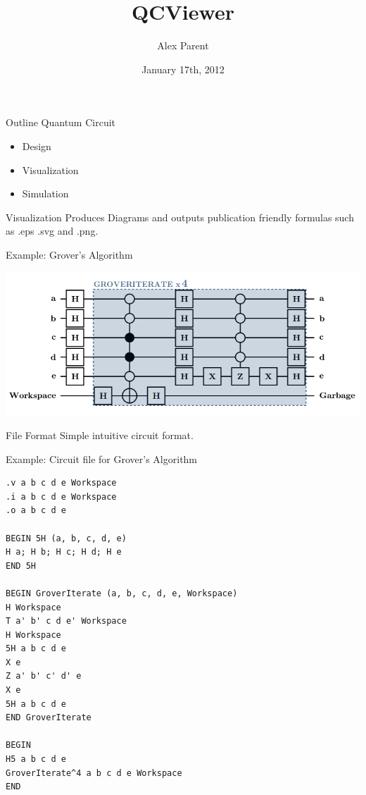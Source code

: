 \documentclass{beamer}
\title{QCViewer}
\author{Alex Parent}
\institute{University of Waterloo, IQC}
\date{January 17th, 2012}
\begin{document}
\begin{frame}
\titlepage
\end{frame}

\begin{frame}{Outline}
Quantum Circuit
\begin{itemize}
\item Design
\item Visualization 
\item Simulation  
\end{itemize}
\end{frame}

\begin{frame}{Visualization}
Produces Diagrams and outputs publication friendly formulas 
such as .eps .svg and .png.

Example: Grover's Algorithm 
\begin{center}
\includegraphics[scale=0.32]{grover_circuit}
\end{center}
\end{frame}

\begin{frame}[fragile]{File Format}
Simple intuitive circuit format.

Example: Circuit file for Grover's Algorithm
\begin{center}
\begin{tiny}
\begin{BVerbatim}[boxwidth=auto]
.v a b c d e Workspace
.i a b c d e Workspace
.o a b c d e

BEGIN 5H (a, b, c, d, e)
H a; H b; H c; H d; H e
END 5H

BEGIN GroverIterate (a, b, c, d, e, Workspace)
H Workspace
T a' b' c d e' Workspace
H Workspace
5H a b c d e
X e
Z a' b' c' d' e
X e
5H a b c d e
END GroverIterate

BEGIN
H5 a b c d e
GroverIterate^4 a b c d e Workspace
END
\end{BVerbatim}
\end{tiny}

\end{center}

\end{frame}
\end{document}
